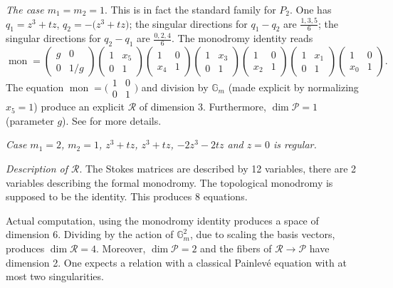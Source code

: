 \documentclass[pdftex]{sigma}
\numberwithin{equation}{section}
\begin{document}
 {\it The case $m_1=m_2=1$}. This is in fact the standard family for $P_2$. One has $q_1=z^3+tz$, $q_2=-\bigl(z^3+tz\bigr)$; the singular directions for $q_1-q_2$ are $\frac{1,3,5}{6}$; the singular directions for
 $q_2-q_1$ are $\frac{0,2,4}{6}$. The monodromy identity reads
 \[\operatorname{mon}=\begin{pmatrix}g& 0\\ 0 &1/g \end{pmatrix} \begin{pmatrix}1& x_5\\0& 1\end{pmatrix} \begin{pmatrix}1& 0\\x_4& 1\end{pmatrix} \begin{pmatrix}1& x_3\\0& 1\end{pmatrix} \begin{pmatrix}1& 0\\x_2& 1 \end{pmatrix}\begin{pmatrix}1& x_1\\0& 1 \end{pmatrix} \begin{pmatrix}1& 0\\x_0& 1\end{pmatrix}.\]
 The equation $\operatorname{mon}=\bigl(\begin{smallmatrix}1& 0\\0& 1\end{smallmatrix}\bigr)$ and division by $\mathbb{G}_m$ (made explicit by normalizing $x_5=1$) produce an explicit
 $\mathcal{R}$ of dimension 3. Furthermore, $\dim \mathcal{P}=1$ (parameter $g$). See \cite[Section~3.9]{vdP-Sa} for more details.

{\it Case $m_1=2$, $m_2=1$, $z^3+tz$, $z^3+tz$, $-2z^3-2tz$ and $z=0$ is regular.}

{\it Description of $\mathcal{R}$}.
The Stokes matrices are described by 12 variables, there are 2 variables describing the formal monodromy. The topological monodromy is
supposed to be the identity. This produces 8 equations.

Actual computation, using the monodromy identity produces a space of dimension 6. Dividing by the action of
$\mathbb{G}_m^2$, due to scaling the basis vectors, produces $\dim \mathcal{R}=4$. Moreover, $\dim \mathcal{P}=2$ and the fibers of
$\mathcal{R}\rightarrow \mathcal{P}$ have dimension 2. One expects a relation with a classical Painlev\'e equation with at most two singularities.
\end{document}
